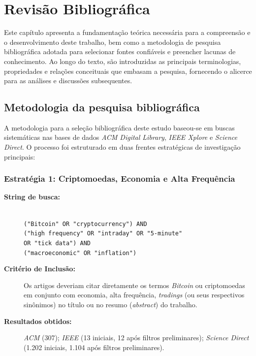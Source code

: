 \documentclass[
    12pt,                %
    openright,           %
    oneside,             %
    a4paper,             %
    english,             %
    brazil               %
]{abntex2}
\begin{document}
\chapter{Revisão Bibliográfica}
\label{cap:revisao}

Este capítulo apresenta a fundamentação teórica necessária para a compreensão e
o desenvolvimento deste trabalho, bem como a metodologia de pesquisa bibliográfica
adotada para selecionar fontes confiáveis e preencher lacunas de conhecimento. Ao longo
do texto, são introduzidas as principais terminologias, propriedades e relações conceituais
que embasam a pesquisa, fornecendo o alicerce para as análises e discussões subsequentes.

\section{Metodologia da pesquisa bibliográfica}

A metodologia para a seleção bibliográfica deste estudo baseou-se em buscas sistemáticas nas bases de dados \textit{ACM Digital Library}, \textit{IEEE Xplore} e 
\textit{Science Direct}. O processo foi estruturado em duas frentes estratégicas de investigação principais:

\subsection{Estratégia 1: Criptomoedas, Economia e Alta Frequência}
\begin{description}
    \item[\textbf{String de busca:}] \hfill \\
    \texttt{("Bitcoin" OR "cryptocurrency") AND} \\
    \texttt{("high frequency" OR "intraday" OR "5-minute"} \\
    \texttt{OR "tick data") AND} \\
    \texttt{("macroeconomic" OR "inflation")}
    \item[\textbf{Critério de Inclusão:}] Os artigos deveriam citar diretamente os termos \textit{Bitcoin} ou criptomoedas em conjunto com economia, alta frequência, \textit{tradings} (ou seus respectivos sinônimos) no título ou no resumo (\textit{abstract}) do trabalho.
    \item[\textbf{Resultados obtidos:}] \textit{ACM} (307); \textit{IEEE} (13 iniciais, 12 após filtros preliminares); \textit{Science Direct} (1.202 iniciais, 1.104 após filtros preliminares).
\end{description}
\end{document}
